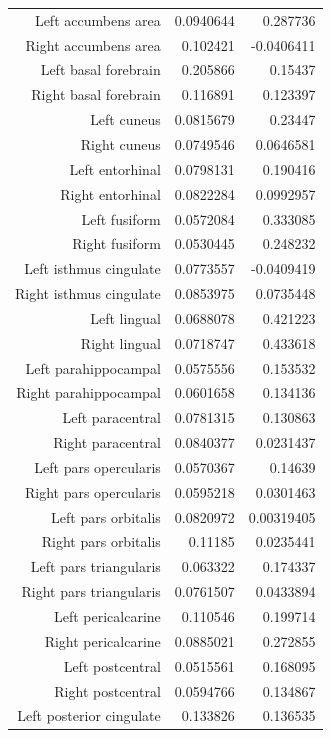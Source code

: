 \documentclass{article}
\begin{document}
\begin{table}
\begin{tabular}{|r|r|r|}
      Left accumbens area & 0.0940644 & 0.287736 \\
      Right accumbens area & 0.102421 & -0.0406411 \\
      Left basal forebrain & 0.205866 & 0.15437 \\
      Right basal forebrain & 0.116891 & 0.123397 \\
      Left cuneus & 0.0815679 & 0.23447 \\
      Right cuneus & 0.0749546 & 0.0646581 \\
      Left entorhinal & 0.0798131 & 0.190416 \\
      Right entorhinal & 0.0822284 & 0.0992957 \\
      Left fusiform & 0.0572084 & 0.333085 \\
      Right fusiform & 0.0530445 & 0.248232 \\
      Left isthmus cingulate & 0.0773557 & -0.0409419 \\
      Right isthmus cingulate & 0.0853975 & 0.0735448 \\
      Left lingual & 0.0688078 & 0.421223 \\
      Right lingual & 0.0718747 & 0.433618 \\
      Left parahippocampal & 0.0575556 & 0.153532 \\
      Right parahippocampal & 0.0601658 & 0.134136 \\
      Left paracentral & 0.0781315 & 0.130863 \\
      Right paracentral & 0.0840377 & 0.0231437 \\
      Left pars opercularis & 0.0570367 & 0.14639 \\
      Right pars opercularis & 0.0595218 & 0.0301463 \\
      Left pars orbitalis & 0.0820972 & 0.00319405 \\
      Right pars orbitalis & 0.11185 & 0.0235441 \\
      Left pars triangularis & 0.063322 & 0.174337 \\
      Right pars triangularis & 0.0761507 & 0.0433894 \\
      Left pericalcarine & 0.110546 & 0.199714 \\
      Right pericalcarine & 0.0885021 & 0.272855 \\
      Left postcentral & 0.0515561 & 0.168095 \\
      Right postcentral & 0.0594766 & 0.134867 \\
      Left posterior cingulate & 0.133826 & 0.136535 \\

\end{tabular}
\end{table}
\end{document}
